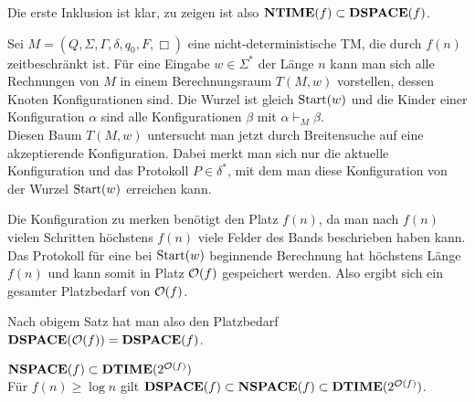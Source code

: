 \begin{Beweis}
    Die erste Inklusion ist klar, zu zeigen ist also $\mathbf{NTIME}(f) \subset \mathbf{DSPACE}(f)$.
    
    Sei $M = (Q, \Sigma, \Gamma, \delta, q_0, F, \Box)$ eine nicht-deterministische TM,
    die durch $f(n)$ zeitbeschränkt ist.
    Für eine Eingabe $w \in \Sigma^\ast$ der Länge $n$ kann man sich alle Rechnungen von $M$
    in einem Berechnungsraum $T(M, w)$ vorstellen,
    dessen Knoten Konfigurationen sind.
    Die Wurzel ist gleich $\text{Start}(w)$ und
    die Kinder einer Konfiguration $\alpha$ sind alle Konfigurationen $\beta$ mit
    $\alpha \vdash_M \beta$.\\
    Diesen Baum $T(M, w)$ untersucht man jetzt durch Breitensuche auf eine akzeptierende
    Konfiguration.
    Dabei merkt man sich nur die aktuelle Konfiguration und das Protokoll $P \in \delta^\ast$,
    mit dem man diese Konfiguration von der Wurzel $\text{Start}(w)$ erreichen kann.
    
    Die Konfiguration zu merken benötigt den Platz $f(n)$, da man nach $f(n)$ vielen Schritten
    höchstens $f(n)$ viele Felder des Bands beschrieben haben kann.
    Das Protokoll für eine bei $\text{Start}(w)$ beginnende Berechnung hat höchstens Länge $f(n)$ und
    kann somit in Platz $\mathcal{O}(f)$ gespeichert werden.
    Also ergibt sich ein gesamter Platzbedarf von $\mathcal{O}(f)$.
    
    Nach obigem Satz hat man also den Platzbedarf $\mathbf{DSPACE}(\mathcal{O}(f)) = \mathbf{DSPACE}(f)$.
\end{Beweis}

\linie

\begin{Satz}{$\mathbf{NSPACE}(f) \subset \mathbf{DTIME}(2^{\mathcal{O}(f)})$}\\
    Für $f(n) \ge \log n$ gilt $\mathbf{DSPACE}(f) \subset \mathbf{NSPACE}(f) \subset \mathbf{DTIME}(2^{\mathcal{O}(f)})$.
\end{Satz}

